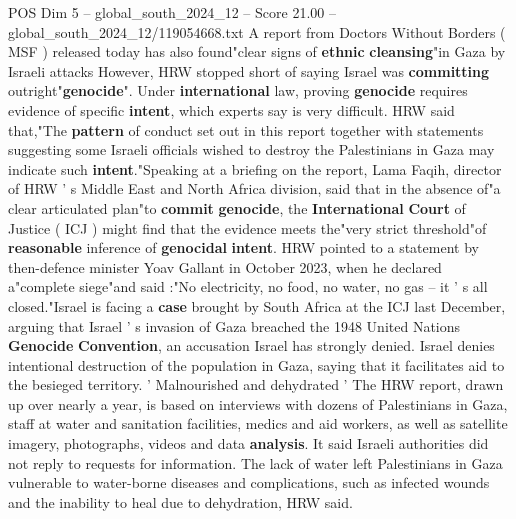 \begin{textsample}{POS Dim 5 – global\_south\_2024\_12 – Score 21.00 – global\_south\_2024\_12/119054668.txt}
A report from Doctors Without Borders ( MSF ) released today has also found"clear signs of \textbf{ethnic} \textbf{cleansing}"in Gaza by Israeli attacks However, HRW stopped short of saying Israel was \textbf{committing} outright"\textbf{genocide}".
Under \textbf{international} law, proving \textbf{genocide} requires evidence of specific \textbf{intent}, which experts say is very difficult.
HRW said that,"The \textbf{pattern} of conduct set out in this report together with statements suggesting some Israeli officials wished to destroy the Palestinians in Gaza may indicate such \textbf{intent}."Speaking at a briefing on the report, Lama Faqih, director of HRW ' s Middle East and North Africa division, said that in the absence of"a clear articulated plan"to \textbf{commit} \textbf{genocide}, the \textbf{International} \textbf{Court} of Justice ( ICJ ) might find that the evidence meets the"very strict threshold"of \textbf{reasonable} inference of \textbf{genocidal} \textbf{intent}.
HRW pointed to a statement by then-defence minister Yoav Gallant in October 2023, when he declared a"complete siege"and said :"No electricity, no food, no water, no gas -- it ' s all closed."Israel is facing a \textbf{case} brought by South Africa at the ICJ last December, arguing that Israel ' s invasion of Gaza breached the 1948 United Nations \textbf{Genocide} \textbf{Convention}, an accusation Israel has strongly denied.
Israel denies intentional destruction of the population in Gaza, saying that it facilitates aid to the besieged territory. ' Malnourished and dehydrated ' The HRW report, drawn up over nearly a year, is based on interviews with dozens of Palestinians in Gaza, staff at water and sanitation facilities, medics and aid workers, as well as satellite imagery, photographs, videos and data \textbf{analysis}.
It said Israeli authorities did not reply to requests for information.
The lack of water left Palestinians in Gaza vulnerable to water-borne diseases and complications, such as infected wounds and the inability to heal due to dehydration, HRW said.

\end{textsample}
